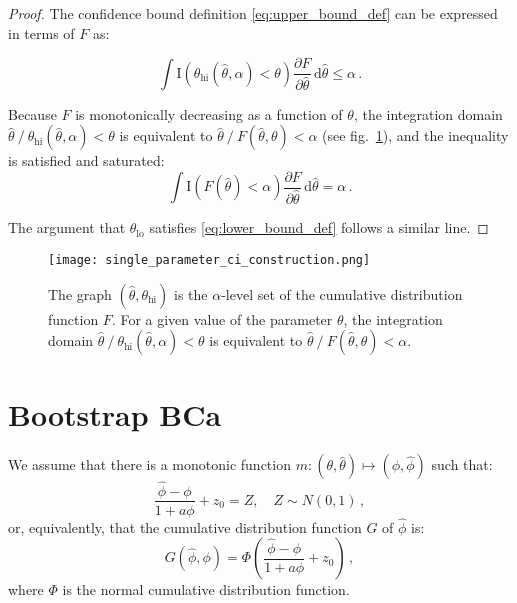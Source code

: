 \documentclass{article}
\newcommand{\dd}{\mathrm{d}}
\newcommand{\indicator}[1]{\mathrm{I}\left(#1\right)}
\begin{document}
\begin{proof}
The confidence bound definition \eqref{eq:upper_bound_def} can be
expressed in terms of $F$ as:

\begin{equation}
\int \indicator{\theta_{\mathrm{hi}}(\hat{\theta}, \alpha) < \theta} 
\frac{\partial F}{\partial \hat{\theta}}\, \dd \hat{\theta} \le \alpha\,.
\end{equation}

Because $F$ is monotonically decreasing as a function of $\theta$, the
integration domain $\hat\theta\ /\ \theta_{\mathrm{hi}}(\hat{\theta}, \alpha) <
\theta$ is equivalent to $\hat\theta\ /\ F(\hat\theta, \theta) < \alpha$ (see
fig.~\ref{fig:single_parameter_ci_construction}), and the inequality is
satisfied and saturated:
\begin{equation}
\int \indicator{F(\hat\theta) < \alpha} 
\frac{\partial F}{\partial \hat{\theta}}\, \dd \hat{\theta} = \alpha\,.
\end{equation}

The argument that $\theta_{\mathrm{lo}}$ satisfies \eqref{eq:lower_bound_def}
follows a similar line.
\end{proof}

\begin{figure}
\begin{center}
\texttt{[image: single\_parameter\_ci\_construction.png]}
\end{center}
\caption{\label{fig:single_parameter_ci_construction}
The graph $(\hat\theta, \theta_{\mathrm{hi}})$ is the $\alpha$-level set of the
cumulative distribution function $F$. For a given value of the parameter
$\theta$, the integration domain $\hat\theta\ /\
\theta_{\mathrm{hi}}(\hat{\theta}, \alpha) < \theta$ is equivalent to
$\hat\theta\ /\ F(\hat\theta, \theta) < \alpha$.
}
\end{figure}

\section{Bootstrap BCa}

We assume that there is a monotonic function $m: (\theta, \hat \theta) \mapsto
(\phi, \hat \phi)$ such that:
\begin{equation}\label{eq:phi_hat_def}
\frac{\hat \phi - \phi} {1 + a \phi} + z_0 = Z,\quad Z \sim N(0, 1)\,,
\end{equation}
or, equivalently, that the cumulative distribution function $G$ of $\hat \phi$
is:
\begin{equation}\label{eq:phi_hat_cdf}
G(\hat\phi, \phi) = 
    \Phi\left(\frac{\hat \phi - \phi} {1 + a \phi} + z_0\right)\,,
\end{equation}
where $\Phi$ is the normal cumulative distribution function.
\end{document}
